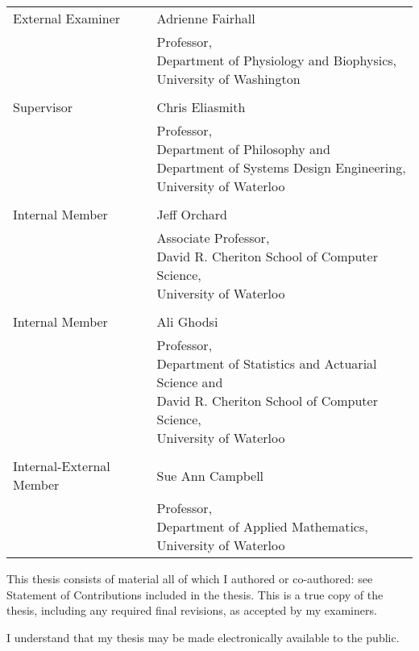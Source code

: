 \noindent\begin{tabular}{@{}ll}\\
    External Examiner & Adrienne Fairhall \\ & \pbox{20cm}{
        Professor, \\
        Department of Physiology and Biophysics, \\
        University of Washington} \\ \\
    Supervisor & Chris Eliasmith \\ & \pbox{20cm}{
        Professor, \\
        Department of Philosophy and \\
        Department of Systems Design Engineering, \\
        University of Waterloo} \\ \\
    Internal Member & Jeff Orchard \\ & \pbox{20cm}{
        Associate Professor, \\
        David R. Cheriton School of Computer Science, \\
        University of Waterloo} \\ \\
    Internal Member & Ali Ghodsi \\ & \pbox{20cm}{
        Professor, \\
        Department of Statistics and Actuarial Science and \\
        David R. Cheriton School of Computer Science, \\
        University of Waterloo} \\ \\
    Internal-External Member & Sue Ann Campbell \\ & \pbox{20cm}{
        Professor, \\
        Department of Applied Mathematics, \\
        University of Waterloo}
\end{tabular}

\cleardoublepage

\noindent
This thesis consists of material all of which I authored or co-authored: see Statement of Contributions included in the thesis. This is a true copy of the thesis, including any required final revisions, as accepted by my examiners.

\bigskip

\noindent
I understand that my thesis may be made electronically available to
the public.

